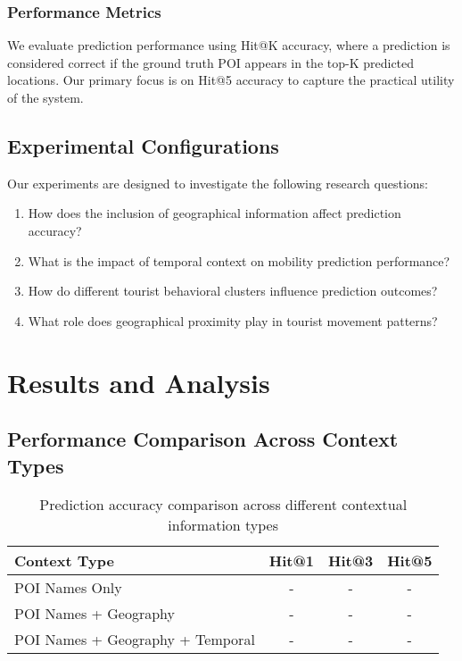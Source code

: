\documentclass[12pt,a4paper]{article}
\begin{document}
\subsubsection{Performance Metrics}
We evaluate prediction performance using Hit@K accuracy, where a prediction is considered correct if the ground truth POI appears in the top-K predicted locations. Our primary focus is on Hit@5 accuracy to capture the practical utility of the system.

\subsection{Experimental Configurations}

Our experiments are designed to investigate the following research questions:

\begin{enumerate}
\item How does the inclusion of geographical information affect prediction accuracy?
\item What is the impact of temporal context on mobility prediction performance?
\item How do different tourist behavioral clusters influence prediction outcomes?
\item What role does geographical proximity play in tourist movement patterns?
\end{enumerate}

\section{Results and Analysis}

\subsection{Performance Comparison Across Context Types}

\begin{table}[H]
\centering
\caption{Prediction accuracy comparison across different contextual information types}
\label{tab:context_comparison}
\begin{tabular}{@{}lccc@{}}
\toprule
Context Type & Hit@1 & Hit@3 & Hit@5 \\
\midrule
POI Names Only & - & - & - \\
POI Names + Geography & - & - & - \\
POI Names + Geography + Temporal & - & - & - \\
\bottomrule
\end{tabular}
\end{table}
\end{document}
